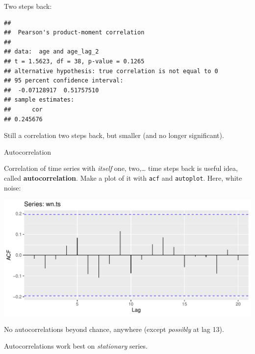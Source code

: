\documentclass[ignorenonframetext,]{beamer}
\newenvironment{Shaded}{\begin{snugshade}}{\end{snugshade}}
\newcommand{\DataTypeTok}[1]{\textcolor[rgb]{0.13,0.29,0.53}{#1}}
\newcommand{\DecValTok}[1]{\textcolor[rgb]{0.00,0.00,0.81}{#1}}
\newcommand{\KeywordTok}[1]{\textcolor[rgb]{0.13,0.29,0.53}{\textbf{#1}}}
\newcommand{\NormalTok}[1]{#1}
\newcommand{\OperatorTok}[1]{\textcolor[rgb]{0.81,0.36,0.00}{\textbf{#1}}}
\newcommand{\StringTok}[1]{\textcolor[rgb]{0.31,0.60,0.02}{#1}}
\begin{document}
\begin{frame}[fragile]{Two steps back:}
\protect\hypertarget{two-steps-back}{}

\small

\begin{Shaded}
\end{Shaded}

\begin{verbatim}
## 
##  Pearson's product-moment correlation
## 
## data:  age and age_lag_2
## t = 1.5623, df = 38, p-value = 0.1265
## alternative hypothesis: true correlation is not equal to 0
## 95 percent confidence interval:
##  -0.07128917  0.51757510
## sample estimates:
##      cor 
## 0.245676
\end{verbatim}

\normalsize

Still a correlation two steps back, but smaller (and no longer
significant).

\end{frame}

\begin{frame}[fragile]{Autocorrelation}
\protect\hypertarget{autocorrelation}{}

Correlation of time series with \emph{itself} one, two,\ldots{} time
steps back is useful idea, called \textbf{autocorrelation}. Make a plot
of it with \texttt{acf} and \texttt{autoplot}. Here, white noise:

\begin{Shaded}
\end{Shaded}

\includegraphics{figure/unnamed-chunk-585-1.pdf}

No autocorrelations beyond chance, anywhere (except \emph{possibly} at
lag 13).

Autocorrelations work best on \emph{stationary} series.

\end{frame}
\end{document}
